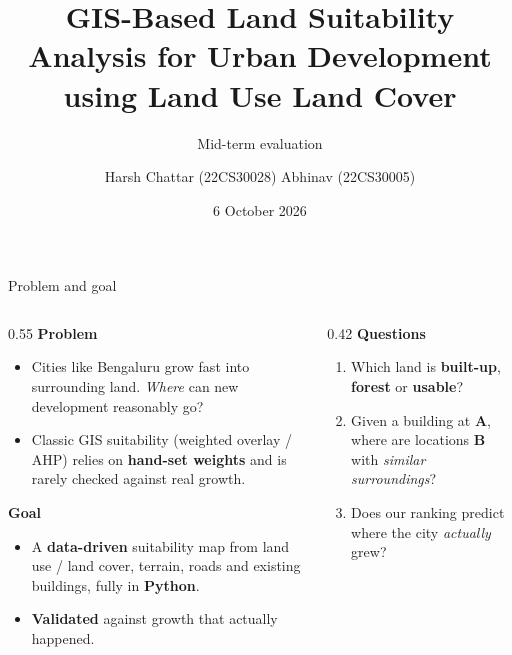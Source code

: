 \documentclass[aspectratio=169,11pt]{beamer}
\title{GIS-Based Land Suitability Analysis for Urban Development\\using Land Use Land Cover}
\subtitle{Mid-term evaluation}
\author{Harsh Chattar (22CS30028) \quad Abhinav (22CS30005)}
\institute{CS60111 Geographical Information Systems\\[0.4em]
  \href{https://github.com/code-Harsh247/gis-urban-suitability}{\textcolor{accent}{github.com/code-Harsh247/gis-urban-suitability}}}
\date{6 October 2026}
\newcommand{\hl}[1]{\alert{\textbf{#1}}}
\begin{document}
\maketitle

\begin{frame}{Problem and goal}
  \small
  \begin{columns}[T]
    \begin{column}{0.55\textwidth}
      \textbf{Problem}
      \begin{itemize}
        \item Cities like Bengaluru grow fast into surrounding land.
              \emph{Where} can new development reasonably go?
        \item Classic GIS suitability (weighted overlay / AHP) relies on
              \hl{hand-set weights} and is rarely checked against real growth.
      \end{itemize}
      \vspace{0.5em}
      \textbf{Goal}
      \begin{itemize}
        \item A \hl{data-driven} suitability map from land use / land cover,
              terrain, roads and existing buildings, fully in \textbf{Python}.
        \item \hl{Validated} against growth that actually happened.
      \end{itemize}
    \end{column}
    \begin{column}{0.42\textwidth}
      \textbf{Questions}
      \begin{enumerate}
        \item Which land is \textcolor{built}{\textbf{built-up}},
              \textcolor{done}{\textbf{forest}} or \textbf{usable}?
        \item Given a building at \textbf{A}, where are locations \textbf{B}
              with \emph{similar surroundings}?
        \item Does our ranking predict where the city \emph{actually} grew?
      \end{enumerate}
    \end{column}
  \end{columns}
\end{frame}
\end{document}
